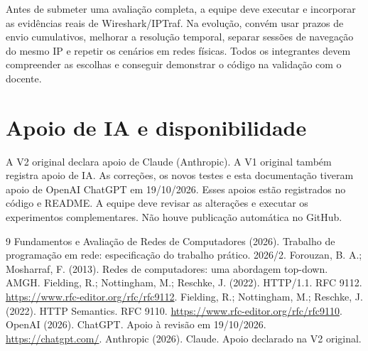 \documentclass[12pt]{article}
\begin{document}
Antes de submeter uma avaliação completa, a equipe deve executar e incorporar
as evidências reais de Wireshark/IPTraf. Na evolução, convém usar prazos de envio
cumulativos, melhorar a resolução temporal, separar sessões de navegação do mesmo
IP e repetir os cenários em redes físicas. Todos os integrantes devem compreender
as escolhas e conseguir demonstrar o código na validação com o docente.

\section{Apoio de IA e disponibilidade}
A V2 original declara apoio de Claude (Anthropic). A V1 original também registra
apoio de IA. As correções, os novos testes e esta documentação tiveram apoio de
OpenAI ChatGPT em 19/10/2026. Esses apoios estão registrados no código e README.
A equipe deve revisar as alterações e executar os experimentos complementares.
Não houve publicação automática no GitHub.

\begin{thebibliography}{9}
 Fundamentos e Avaliação de Redes de Computadores (2026).
Trabalho de programação em rede: especificação do trabalho prático. 2026/2.
 Forouzan, B. A.; Mosharraf, F. (2013). Redes de computadores:
uma abordagem top-down. AMGH.
 Fielding, R.; Nottingham, M.; Reschke, J. (2022). HTTP/1.1.
RFC 9112. \url{https://www.rfc-editor.org/rfc/rfc9112}.
 Fielding, R.; Nottingham, M.; Reschke, J. (2022). HTTP Semantics.
RFC 9110. \url{https://www.rfc-editor.org/rfc/rfc9110}.
 OpenAI (2026). ChatGPT. Apoio à revisão em 19/10/2026.
\url{https://chatgpt.com/}. Anthropic (2026). Claude. Apoio declarado na V2 original.
\end{thebibliography}
\end{document}
